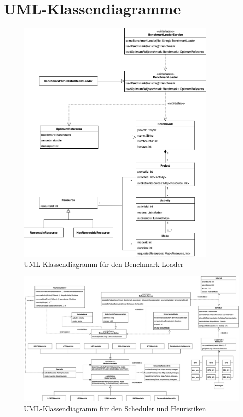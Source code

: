 \chapter{UML-Klassendiagramme}

\begin{figure}[H]
    \centering
    \includegraphics[width=0.85\textwidth]{assets/img/04_Umsetzung/BenchmarkLoaderInstanceSets.png}
    \caption{UML-Klassendiagramm für den Benchmark Loader} 
    \label{img:mrcpsp_framework_benchmarkloader}
\end{figure}


\begin{figure}
    \centering
    \includegraphics[angle=90,height=0.90\textheight]{assets/img/04_Umsetzung/Klassendiagramm_SchedulerHeuristiken.png}
    \caption{UML-Klassendiagramm für den Scheduler und Heuristiken} 
    \label{img:mrcpsp_framework_schedulerheuristiken}
\end{figure}

